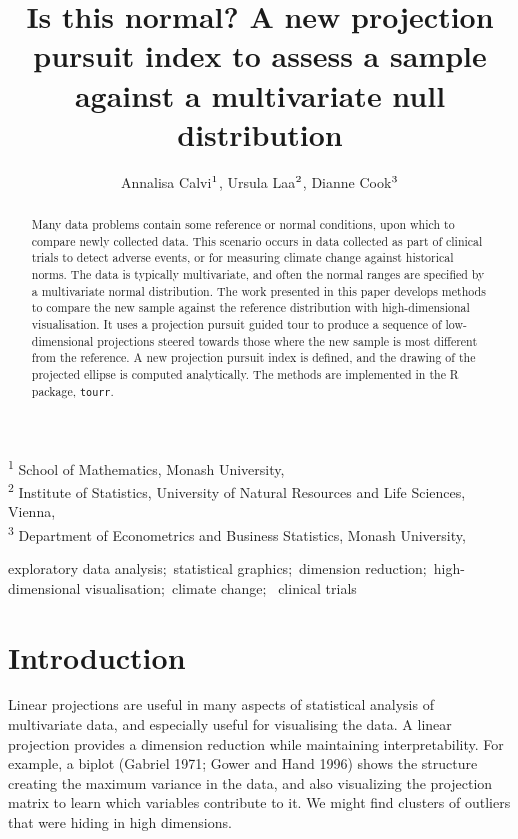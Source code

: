 \documentclass[
  12pt,
]{interact}
\title{Is this normal? A new projection pursuit index to assess a sample
against a multivariate null distribution}
\author{Annalisa Calvi$\textsuperscript{1}$, Ursula
Laa$\textsuperscript{2}$, Dianne Cook$\textsuperscript{3}$}
\begin{document}
\captionsetup{labelsep=space}
\maketitle
\textsuperscript{1} School of Mathematics, Monash
University,  \\ \textsuperscript{2} Institute of Statistics, University
of Natural Resources and Life Sciences,
Vienna,  \\ \textsuperscript{3} Department of Econometrics and Business
Statistics, Monash University,  
\begin{abstract}
Many data problems contain some reference or normal conditions, upon
which to compare newly collected data. This scenario occurs in data
collected as part of clinical trials to detect adverse events, or for
measuring climate change against historical norms. The data is typically
multivariate, and often the normal ranges are specified by a
multivariate normal distribution. The work presented in this paper
develops methods to compare the new sample against the reference
distribution with high-dimensional visualisation. It uses a projection
pursuit guided tour to produce a sequence of low-dimensional projections
steered towards those where the new sample is most different from the
reference. A new projection pursuit index is defined, and the drawing of
the projected ellipse is computed analytically. The methods are
implemented in the R package, \texttt{tourr}.
\end{abstract}
\begin{keywords}
\def\sep{;\ }
exploratory data analysis\sep statistical graphics\sep dimension
reduction\sep high-dimensional visualisation\sep climate change\sep 
clinical trials
\end{keywords}

\section{Introduction}\label{introduction}

Linear projections are useful in many aspects of statistical analysis of
multivariate data, and especially useful for visualising the data. A
linear projection provides a dimension reduction while maintaining
interpretability. For example, a biplot (Gabriel 1971; Gower and Hand
1996) shows the structure creating the maximum variance in the data, and
also visualizing the projection matrix to learn which variables
contribute to it. We might find clusters of outliers that were hiding in
high dimensions.
\end{document}
